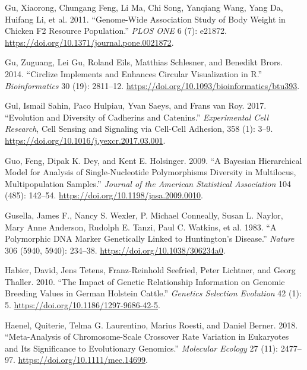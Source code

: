 \documentclass[
]{book}
\newlength{\cslhangindent}
\newlength{\cslentryspacingunit} %
\newenvironment{CSLReferences}[2] %
 {%
  \setlength{\parindent}{0pt}
  \ifodd #1
  \let\oldpar\par
  \def\par{\hangindent=\cslhangindent\oldpar}
  \fi
  \setlength{\parskip}{#2\cslentryspacingunit}
 }%
 {}
\begin{document}
\begin{CSLReferences}{1}{0}
\leavevmode{}%
Gu, Xiaorong, Chungang Feng, Li Ma, Chi Song, Yanqiang Wang, Yang Da, Huifang Li, et al. 2011. {``Genome-{Wide Association Study} of {Body Weight} in {Chicken F2 Resource Population}.''} \emph{PLOS ONE} 6 (7): e21872. \url{https://doi.org/10.1371/journal.pone.0021872}.

\leavevmode{}%
Gu, Zuguang, Lei Gu, Roland Eils, Matthias Schlesner, and Benedikt Brors. 2014. {``Circlize Implements and Enhances Circular Visualization in {R}.''} \emph{Bioinformatics} 30 (19): 2811--12. \url{https://doi.org/10.1093/bioinformatics/btu393}.

\leavevmode{}%
Gul, Ismail Sahin, Paco Hulpiau, Yvan Saeys, and Frans van Roy. 2017. {``Evolution and Diversity of Cadherins and Catenins.''} \emph{Experimental Cell Research}, Cell {Sensing} and {Signaling} via {Cell-Cell Adhesion}, 358 (1): 3--9. \url{https://doi.org/10.1016/j.yexcr.2017.03.001}.

\leavevmode{}%
Guo, Feng, Dipak K. Dey, and Kent E. Holsinger. 2009. {``A {Bayesian Hierarchical Model} for {Analysis} of {Single-Nucleotide Polymorphisms Diversity} in {Multilocus}, {Multipopulation Samples}.''} \emph{Journal of the American Statistical Association} 104 (485): 142--54. \url{https://doi.org/10.1198/jasa.2009.0010}.

\leavevmode{}%
Gusella, James F., Nancy S. Wexler, P. Michael Conneally, Susan L. Naylor, Mary Anne Anderson, Rudolph E. Tanzi, Paul C. Watkins, et al. 1983. {``A Polymorphic {DNA} Marker Genetically Linked to {Huntington}'s Disease.''} \emph{Nature} 306 (5940, 5940): 234--38. \url{https://doi.org/10.1038/306234a0}.

\leavevmode{}%
Habier, David, Jens Tetens, Franz-Reinhold Seefried, Peter Lichtner, and Georg Thaller. 2010. {``The Impact of Genetic Relationship Information on Genomic Breeding Values in {German Holstein} Cattle.''} \emph{Genetics Selection Evolution} 42 (1): 5. \url{https://doi.org/10.1186/1297-9686-42-5}.

\leavevmode{}%
Haenel, Quiterie, Telma G. Laurentino, Marius Roesti, and Daniel Berner. 2018. {``Meta-Analysis of Chromosome-Scale Crossover Rate Variation in Eukaryotes and Its Significance to Evolutionary Genomics.''} \emph{Molecular Ecology} 27 (11): 2477--97. \url{https://doi.org/10.1111/mec.14699}.


\end{CSLReferences}
\end{document}
